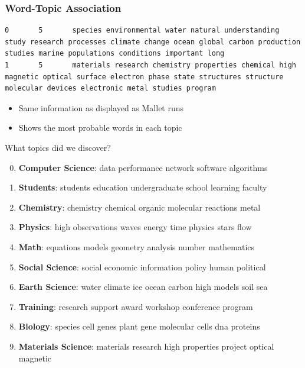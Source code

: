 \begin{frame}[fragile]
  \frametitle{Word-Topic Association}
  \begin{lstlisting}
0       5       species environmental water natural understanding study research processes climate change ocean global carbon production studies marine populations conditions important long 
1       5       materials research chemistry properties chemical high magnetic optical surface electron phase state structures structure molecular devices electronic metal studies program 
    \end{lstlisting}

    \begin{itemize}
      \item Same information as displayed as Mallet runs
        \item Shows the most probable words in each topic
      \end{itemize}

\end{frame}


\begin{frame}{What topics did we discover?}
\small
  \begin{enumerate}
    \setcounter{enumi}{-1}
    \item {\bf Computer Science}: data performance network software algorithms 
    \item {\bf Students}: students education undergraduate school learning faculty 
    \item {\bf Chemistry}: chemistry chemical organic molecular reactions metal
    \item {\bf Physics}: high observations waves energy time physics stars flow 
    \item {\bf Math}: equations models geometry analysis number mathematics
    \item {\bf Social Science}: social economic information policy human political 
    \item {\bf Earth Science}: water climate ice ocean carbon high models soil sea
    \item {\bf Training}: research support award workshop conference program 
    \item {\bf Biology}: species cell genes plant gene molecular cells dna proteins
    \item {\bf Materials Science}: materials research high properties
      project optical magnetic
    \end{enumerate}
\end{frame}

